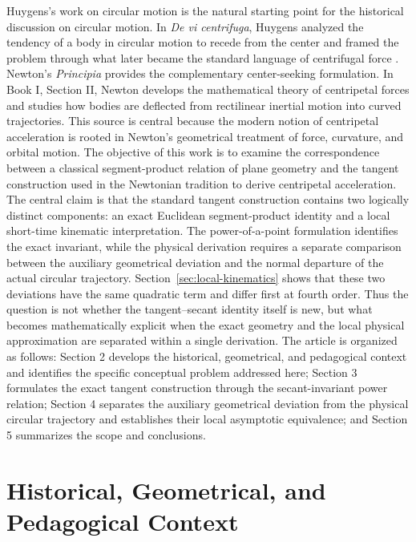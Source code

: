 \documentclass[preprint,12pt,3p,nopreprintline]{elsarticle}
\numberwithin{equation}{section}
\theoremstyle{remark}
\begin{document}
Huygens's work on circular motion is the natural starting point for the historical discussion on circular motion. In \textit{De vi centrifuga}, Huygens analyzed the tendency of a body in circular motion to recede from the center and framed the problem through what later became the standard language of centrifugal force \cite{huygens1888devi, yoder2013catalogue}. Newton's \textit{Principia} \cite{newton1729principia} provides the complementary center-seeking formulation. In Book I, Section II, Newton develops the mathematical theory of centripetal forces and studies how bodies are deflected from rectilinear inertial motion into curved trajectories. This source is central because the modern notion of centripetal acceleration is rooted in Newton's geometrical treatment of force, curvature, and orbital motion. The objective of this work is to examine the correspondence between a classical segment-product relation of plane geometry and the tangent construction used in the Newtonian tradition to derive centripetal acceleration. The central claim is that the standard tangent construction contains two logically distinct components: an exact Euclidean segment-product identity and a local short-time kinematic interpretation. The power-of-a-point formulation identifies the exact invariant, while the physical derivation requires a separate comparison between the auxiliary geometrical deviation and the normal departure of the actual circular trajectory. Section~\ref{sec:local-kinematics} shows that these two deviations have the same quadratic term and differ first at fourth order. Thus the question is not whether the tangent--secant identity itself is new, but what becomes mathematically explicit when the exact geometry and the local physical approximation are separated within a single derivation. The article is organized as follows: Section 2 develops the historical, geometrical, and pedagogical context and identifies the specific conceptual problem addressed here; Section 3 formulates the exact tangent construction through the secant-invariant power relation; Section 4 separates the auxiliary geometrical deviation from the physical circular trajectory and establishes their local asymptotic equivalence; and Section 5 summarizes the scope and conclusions.

\section{Historical, Geometrical, and Pedagogical Context}
\label{sec:review}
\end{document}
